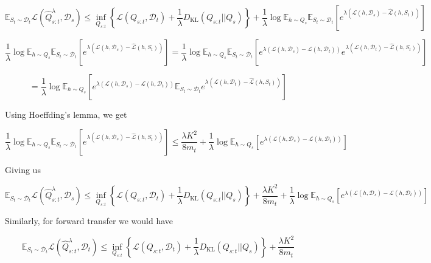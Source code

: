 \documentclass[letterpaper]{article}
\theoremstyle{definition}
\begin{document}
$$\mathbb{E}_{S_t\sim \mathcal{D}_t}\mathcal{L}( \hat{Q}^{\lambda}_{s:t},\mathcal{D}_s)\leq \inf_{Q_{s:t}}\left \{ \mathcal{L}(Q_{s:t},\mathcal{D}_t) + \frac{1}{\lambda}D_{\mathrm{KL}}(Q_{s:t}||Q_{s}) \right \}+\frac{1}{\lambda}\log\mathbb{E}_{h\sim Q_s}\mathbb{E}_{S_t\sim \mathcal{D}_t}\left [e^{\lambda(\mathcal{L}(h,\mathcal{D}_s)-\hat{\mathcal{L}}(h,S_t))} \right ]$$

$$\frac{1}{\lambda}\log\mathbb{E}_{h\sim Q_s}\mathbb{E}_{S_t\sim \mathcal{D}_t}\left [e^{\lambda(\mathcal{L}(h,\mathcal{D}_s)-\hat{\mathcal{L}}(h,S_t))} \right ]=\frac{1}{\lambda}\log\mathbb{E}_{h\sim Q_s}\mathbb{E}_{S_t\sim \mathcal{D}_t}\left [e^{\lambda(\mathcal{L}(h,\mathcal{D}_s)-\mathcal{L}(h,\mathcal{D}_t))}e^{\lambda(\mathcal{L}(h,\mathcal{D}_t)-\hat{\mathcal{L}}(h,S_t))} \right ]$$

$$=\frac{1}{\lambda}\log\mathbb{E}_{h\sim Q_s}\left [e^{\lambda(\mathcal{L}(h,\mathcal{D}_s)-\mathcal{L}(h,\mathcal{D}_t))}\mathbb{E}_{S_t\sim \mathcal{D}_t}e^{\lambda(\mathcal{L}(h,\mathcal{D}_t)-\hat{\mathcal{L}}(h,S_t))} \right ]$$

Using Hoeffding's lemma, we get

$$\frac{1}{\lambda}\log\mathbb{E}_{h\sim Q_s}\mathbb{E}_{S_t\sim \mathcal{D}_t}\left [e^{\lambda(\mathcal{L}(h,\mathcal{D}_s)-\hat{\mathcal{L}}(h,S_t))} \right ] \leq \frac{\lambda K^2}{8m_t}+\frac{1}{\lambda}\log\mathbb{E}_{h\sim Q_s}\left [e^{\lambda(\mathcal{L}(h,\mathcal{D}_s)-\mathcal{L}(h,\mathcal{D}_t))} \right ]$$

Giving us

\begin{equation} \label{eq:oracle-base}
\mathbb{E}_{S_t\sim \mathcal{D}_t}\mathcal{L}( \hat{Q}^{\lambda}_{s:t},\mathcal{D}_s)\leq \inf_{Q_{s:t}}\left \{ \mathcal{L}(Q_{s:t},\mathcal{D}_t) + \frac{1}{\lambda}D_{\mathrm{KL}}(Q_{s:t}||Q_{s}) \right \}+\frac{\lambda K^2}{8m_t}+\frac{1}{\lambda}\log\mathbb{E}_{h\sim Q_s}\left [e^{\lambda(\mathcal{L}(h,\mathcal{D}_s)-\mathcal{L}(h,\mathcal{D}_t))} \right ]
\end{equation}

Similarly, for forward transfer we would have

\begin{equation}
\mathbb{E}_{S_t\sim \mathcal{D}_t}\mathcal{L}(\hat{Q}^{\lambda}_{s:t},\mathcal{D}_t)\leq \inf_{Q_{s:t}}\left \{ \mathcal{L}(Q_{s:t},\mathcal{D}_t) + \frac{1}{\lambda}D_{\mathrm{KL}}(Q_{s:t}||Q_{s}) \right \}+\frac{\lambda K^2}{8m_t}
\end{equation}
\end{document}
